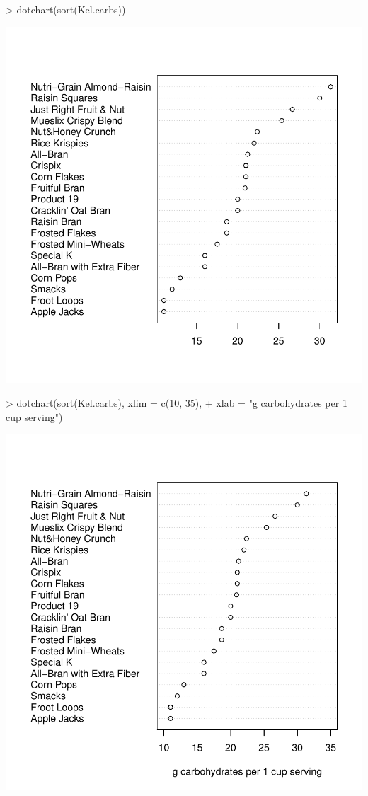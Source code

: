 \documentclass[12pt,letterpaper,final]{article}
\begin{document}
\begin{Schunk}
\begin{Sinput}
> dotchart(sort(Kel.carbs))
\end{Sinput}
\end{Schunk}
\includegraphics{lect_main-018}

\begin{Schunk}
\begin{Sinput}
> dotchart(sort(Kel.carbs), xlim = c(10, 35), 
+   xlab = "g carbohydrates per 1 cup serving")
\end{Sinput}
\end{Schunk}
\includegraphics{lect_main-019}
\end{document}

